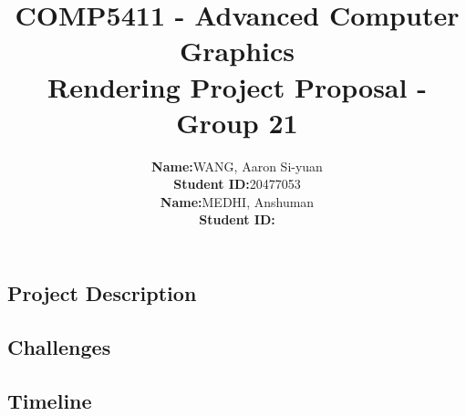 \documentclass[12pt]{article}
\title{
{\LARGE COMP5411 - Advanced Computer Graphics} \\
\textbf{\LARGE Rendering Project Proposal - Group 21} \\
}
\author{ 
\begin{tabular}{R{0.3\textwidth}L{0.4\textwidth}}
\normalsize\textbf{Name:} & \normalsize WANG, Aaron Si-yuan \\
\normalsize\textbf{Student ID:} & \normalsize20477053 \\
\normalsize\textbf{Name:} & \normalsize MEDHI, Anshuman\\
\normalsize\textbf{Student ID:} & \normalsize \\
\end{tabular}
}
\date{}
\theoremstyle{remark}
\begin{document}
\maketitle\thispagestyle{fancy}
\subsection*{Project Description}
\subsection*{Challenges}
\subsection*{Timeline}
\end{document}

